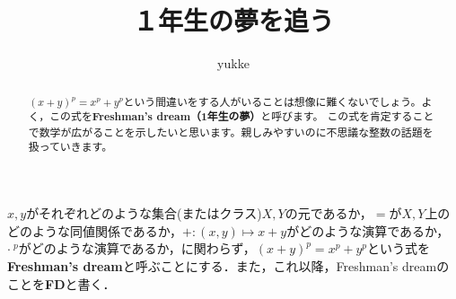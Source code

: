\documentclass[dvipdfmx]{jlreq}
\title{１年生の夢を追う}
\date{}
\author{yukke}
\newenvironment{dfn}{\begin{mydefinition}}{\end{mydefinition}}
\theoremstyle{myproposition}
\begin{document}
\maketitle

\begin{abstract}
    $(x + y)^p = x^p + y^p$という間違いをする人がいることは想像に難くないでしょう。よく，この式を\textbf{Freshman's dream（1年生の夢）}と呼びます。
    この式を肯定することで数学が広がることを示したいと思います。親しみやすいのに不思議な整数の話題を扱っていきます。
\end{abstract}

\begin{dfn} \label{freshman}
    $x,y$がそれぞれどのような集合(またはクラス)$X,Y$の元であるか，$=$が$X,Y$上のどのような同値関係であるか，$+:(x,y)\mapsto x+y$がどのような演算であるか，$\cdot~^p$がどのような演算であるか，に関わらず，$(x + y)^p = x^p + y^p$という式を\textbf{Freshman's dream}と呼ぶことにする．また，これ以降，Freshman's dreamのことを\textbf{\textsf{FD}}と書く．
\end{dfn}

\tableofcontents












\end{document}
